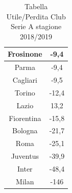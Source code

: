 \documentclass[
    corpo=11.5pt,
    oneside,
    evenboxes,
    tipotesi=triennale,
    stile=classica,
    oldstyle,
    autoretitolo,
    greek,
]{toptesi}
\begin{document}
\begin{interlinea}{1.5}
\begin{table}
{\begin{tabular}{|c|c|}
            \hline
            Frosinone & -9,4 \\
            \hline
            Parma & -9,4 \\
            \hline
            Cagliari & -9,5 \\
            \hline
            Torino & -12,4 \\
            \hline
            Lazio & 13,2 \\
            \hline
            Fiorentina & -15,8 \\
            \hline
            Bologna & -21,7 \\
            \hline
            Roma & -25,1 \\
            \hline
            Juventus & -39,9 \\
            \hline
            Inter & -48,4 \\
            \hline
            Milan & -146 \\
            \hline
    \end{tabular}}
    \caption{Tabella Utile/Perdita Club Serie A stagione 2018/2019}
    \label{tabella_perdite}
\end{table}


\end{interlinea}
\end{document}
